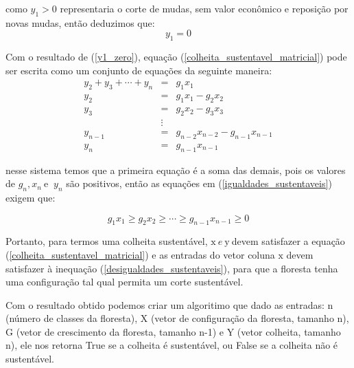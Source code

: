 \documentclass[a4paper, 12pt]{article}
\begin{document}
como $y_1 > 0$ representaria o corte de mudas, sem valor econômico e reposição por novas mudas, então deduzimos que:
\begin{equation}\label{y1_zero}
    y_1 = 0
\end{equation}
 
Com o resultado de (\ref{y1_zero}), equação (\ref{colheita_sustentavel_matricial}) pode ser escrita como um conjunto de equações da seguinte maneira:
\begin{equation}\label{igualdades_sustentaveis}
\begin {matrix}
    y_2 + y_3 + \cdots + y_n & = & g_1 x_1 \\ 
    y_2 & = &g_1 x_1 - g_2 x_2 \\
    y_3 & = &g_2 x_2 - g_3 x_3 \\
    & \vdots &  \\
    y_{n-1} & = &g_{n-2} x_{n-2} - g_{n-1} x_{n-1} \\
    y_n & = & g_{n-1} x_{n-1}
    \end {matrix}
\end{equation}
 
nesse sistema temos que a primeira equação é a soma das demais, pois os valores de $g_n, x_n\: $e $\:y_n$ são positivos, então as equações em (\ref{igualdades_sustentaveis}) exigem que:
 
\begin{equation}\label{desigualdades_sustentaveis}
    g_1x_1 \geq g_2x_2 \geq \cdots \geq g_{n-1}x_{n-1} \geq 0
\end{equation}
 
Portanto, para termos uma colheita sustentável, $\mathrm{x} \: e \: \mathrm {y} \: $devem satisfazer a equação (\ref{colheita_sustentavel_matricial}) e as entradas do vetor coluna $\mathrm {x}$ devem satisfazer à inequação (\ref{desigualdades_sustentaveis}), para que a floresta tenha uma configuração tal qual permita um corte sustentável.
 
Com o resultado obtido podemos criar um algoritimo que dado as entradas: n (número de classes da floresta), X (vetor de configuração da floresta, tamanho n), G (vetor de crescimento da floresta, tamanho n-1) e Y (vetor colheita, tamanho n), ele nos retorna True se a colheita é sustentável, ou False se a colheita não é sustentável.\newline
\end{document}
